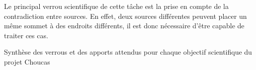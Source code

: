 Le principal verrou scientifique de cette tâche est la prise en compte
de la contradiction entre sources. En effet, deux sources différentes
peuvent placer un même sommet à des endroits différents, il est donc
nécessaire d'être capable de traiter ces cas.

\begin{landscape}
\begin{table}[H]
  \centering
  
  \caption{Synthèse des verrous et des apports attendus pour chaque
    objectif scientifique du projet Choucas}
  \label{tab:synthese_objectifs_choucas}
\end{table}
\end{landscape}


